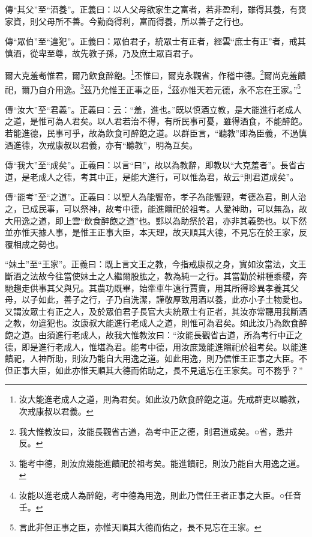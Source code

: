 {\noindent\zhuan{}\fzbyks 傳“其父”至“酒養”。正義曰：以人父母欲家生之富者，若非盈利，雖得其養，有喪家資，則父母所不善。今勤商得利，富而得養，所以善子之行也。 \par}

{\noindent\zhuan{}\fzbyks 傳“眾伯”至“違犯”。正義曰：眾伯君子，統眾士有正者，經雲“庶士有正”者，戒其慎酒，從卑至尊，故先教子孫，乃及庶士眾百君子。 \par}

爾大克羞耇惟君，爾乃飲食醉飽。\footnote{汝大能進老成人之道，則為君矣。如此汝乃飲食醉飽之道。先戒群吏以聽教，次戒康叔以君義。}丕惟曰，爾克永觀省，作稽中德。\footnote{我大惟教汝曰，汝能長觀省古道，為考中正之德，則君道成矣。○省，悉井反。}爾尚克羞饋祀，爾乃自介用逸。\footnote{能考中德，則汝庶幾能進饋祀於祖考矣。能進饋祀，則汝乃能自大用逸之道。}茲乃允惟王正事之臣，\footnote{汝能以進老成人為醉飽，考中德為用逸，則此乃信任王者正事之大臣。○任音壬。}茲亦惟天若元德，永不忘在王家。”\footnote{言此非但正事之臣，亦惟天順其大德而佑之，長不見忘在王家。}

{\noindent\zhuan{}\fzbyks 傳“汝大”至“君義”。正義曰：云：“羞，進也。”既以慎酒立教，是大能進行老成人之道，是惟可為人君矣。以人君若治不得，有所民事可憂，雖得酒食，不能醉飽。若能進德，民事可乎，故為飲食可醉飽之道。以群臣言，“聽教”即為臣義，不過慎酒進德，次戒康叔以君義，亦有“聽教”，明為互矣。 \par}

{\noindent\zhuan{}\fzbyks 傳“我大”至“成矣”。正義曰：以言“曰”，故以為教辭，即教以“大克羞者”。長省古道，是老成人之德，考其中正，是能大進行，可以惟為君，故云“則君道成矣”。 \par}

{\noindent\zhuan{}\fzbyks 傳“能考”至“之道”。正義曰：以聖人為能饗帝，孝子為能饗親，考德為君，則人治之，已成民事，可以祭神，故考中德，能進饋祀於祖考。人愛神助，可以無為，故大用逸之道，即上雲“飲食醉飽之道”也。鄭以為助祭於君，亦非其義勢也。以下然並亦惟天據人事，是惟王正事大臣，本天理，故天順其大德，不見忘在於王家，反覆相成之勢也。 \par}

{\noindent\shu{}\fzkt “妹土”至“王家”。正義曰：既上言文王之教，今指戒康叔之身，實如汝當法，文王斷酒之法故今往當使妹土之人繼爾股肱之，教為純一之行。其當勤於耕種黍稷，奔馳趨走供事其父與兄。其農功既畢，始牽車牛遠行賈賣，用其所得珍異孝養其父母，以子如此，善子之行，子乃自洗潔，謹敬厚致用酒以養，此亦小子土物愛也。又謂汝眾士有正之人，及於眾伯君子長官大夫統眾士有正者，其汝亦常聽用我斷酒之教，勿違犯也。汝康叔大能進行老成人之道，則惟可為君矣。如此汝乃為飲食醉飽之道。由須進行老成人，故我大惟教汝曰：“汝能長觀省古道，所為考行中正之德，即是進行老成人，惟堪為君。能考中德，用汝庶幾能進饋祀於祖考矣。以能進饋祀，人神所助，則汝乃能自大用逸之道。如此用逸，則乃信惟王正事之大臣。不但正事大臣，如此亦惟天順其大德而佑助之，長不見遺忘在王家矣。可不務乎？” \par}

